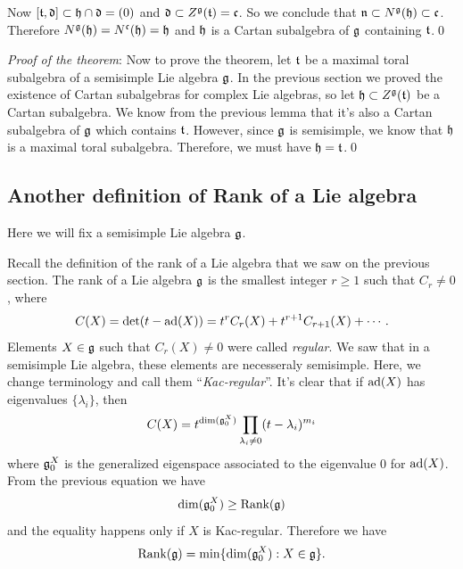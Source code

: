 Now $[\mathfrak{t},\mathfrak{d}]\subset \mathfrak{h}\cap\mathfrak{d}=(0)$ and $\mathfrak{d}\subset Z^{\mathfrak{g}}(\mathfrak{t})=\mathfrak{c}$. So we conclude that 
$\mathfrak{n}\subset N^{\mathfrak{g}}(\mathfrak{h})\subset \mathfrak{c}$. Therefore $N^{\mathfrak{g}}(\mathfrak{h})=N^{\mathfrak{c}}(\mathfrak{h})=\mathfrak{h}$ and 
$\mathfrak{h}$ is a Cartan subalgebra of $\mathfrak{g}$ containing $\mathfrak{t}$.\qed

\textit{Proof of the theorem}:
Now to prove the theorem, let $\mathfrak{t}$ be a maximal toral subalgebra of a semisimple Lie algebra $\mathfrak{g}$. 
In the previous section we proved the existence of Cartan subalgebras for complex Lie algebras, so let 
$\mathfrak{h}\subset Z^{\mathfrak{g}}(\mathfrak{t})$ be a Cartan subalgebra. We know from the previous lemma that it's also 
a Cartan subalgebra of $\mathfrak{g}$ which contains $\mathfrak{t}$. However, since $\mathfrak{g}$ is semisimple, we know that 
$\mathfrak{h}$ is a maximal toral subalgebra. Therefore, we must have $\mathfrak{h}=\mathfrak{t}$.\qed

\subsection{Another definition of Rank of a Lie algebra}
Here we will fix a semisimple Lie algebra $\mathfrak{g}$.\par 


Recall the definition of the rank of a Lie algebra that we saw on the previous section. The rank of 
a Lie algebra $\mathfrak{g}$ is the smallest integer $r\geq1$ such that $C_r\neq0$, where 
\begin{equation}
    C(X)=\det(t-\text{ad}(X))=t^rC_r(X)+t^{r+1}C_{r+1}(X)+\cdots.
\end{equation}
Elements $X\in\mathfrak{g}$ such that $C_r(X)\neq0$ were called \textit{regular}. We saw that in a semisimple Lie algebra, 
these elements are necesseraly semisimple. Here, we change terminology and call them ``\textit{Kac-regular}''.
It's clear that if $\text{ad}(X)$ has eigenvalues $\{\lambda_i\}$, then 
\begin{equation}
    C(X)=t^{\dim(\mathfrak{g}_0^X)}\prod_{\lambda_i\neq0}(t-\lambda_i)^{m_i}
\end{equation}
where $\mathfrak{g}_0^X$ is the generalized eigenspace associated to the eigenvalue 0 for $\text{ad}(X)$. From the previous equation we 
have 
\begin{equation}
    \dim(\mathfrak{g}_0^X)\geq\text{Rank}(\mathfrak{g})
\end{equation}
and the equality happens only if $X$ is Kac-regular. Therefore we have 
\begin{equation}
    \text{Rank}(\mathfrak{g})=\min\{\dim(\mathfrak{g}_0^X):X\in\mathfrak{g}\}.
\end{equation}

